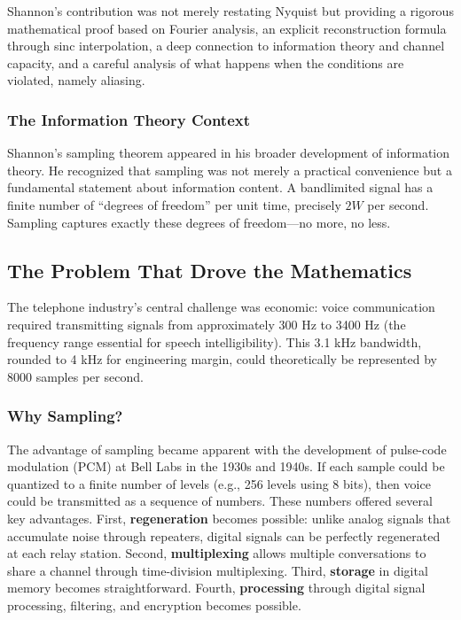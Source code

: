Shannon's contribution was not merely restating Nyquist but providing a rigorous mathematical proof based on Fourier analysis, an explicit reconstruction formula through sinc interpolation, a deep connection to information theory and channel capacity, and a careful analysis of what happens when the conditions are violated, namely aliasing.

\subsubsection{The Information Theory Context}

Shannon's sampling theorem appeared in his broader development of information theory. He recognized that sampling was not merely a practical convenience but a fundamental statement about information content. A bandlimited signal has a finite number of ``degrees of freedom'' per unit time, precisely $2W$ per second. Sampling captures exactly these degrees of freedom---no more, no less.

\subsection{The Problem That Drove the Mathematics}
\label{subsec:telephone_problem}

The telephone industry's central challenge was economic: voice communication required transmitting signals from approximately 300 Hz to 3400 Hz (the frequency range essential for speech intelligibility). This 3.1 kHz bandwidth, rounded to 4 kHz for engineering margin, could theoretically be represented by 8000 samples per second.

\subsubsection{Why Sampling?}

The advantage of sampling became apparent with the development of pulse-code modulation (PCM) at Bell Labs in the 1930s and 1940s. If each sample could be quantized to a finite number of levels (e.g., 256 levels using 8 bits), then voice could be transmitted as a sequence of numbers. These numbers offered several key advantages. First, \textbf{regeneration} becomes possible: unlike analog signals that accumulate noise through repeaters, digital signals can be perfectly regenerated at each relay station. Second, \textbf{multiplexing} allows multiple conversations to share a channel through time-division multiplexing. Third, \textbf{storage} in digital memory becomes straightforward. Fourth, \textbf{processing} through digital signal processing, filtering, and encryption becomes possible.

